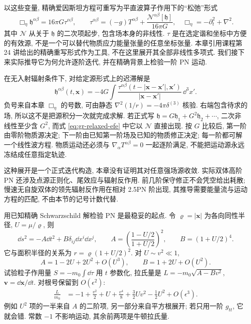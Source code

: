 以这些变量, 精确爱因斯坦方程可重写为平直波算子作用下的“松弛”形式
\begin{equation}
 \Box_\eta\mathfrak h^{\alpha\beta}=16\pi G\tau^{\alpha\beta},\qquad
 \tau^{\alpha\beta}=(-g)T^{\alpha\beta}
                    +\frac{\mathcal N^{\alpha\beta}[\mathfrak h]}{16\pi G},
 \quad \Box_\eta=-\partial_t^2+\nabla^2.
 \label{eq:gr-relaxed-efe}
\end{equation}
其中 $\mathcal N$ 从关于 $\mathfrak h$ 的二次项起步, 包含场本身的非线性. $\tau$ 是在选定谐和坐标中方便的有效源, 不是一个可以替代物质应力能量张量的任意坐标张量. 本章引用课程第 24 讲给出的精确重写形式作为工具, 不在这里展开其全部非线性多项式. 我们接下来实际推导它为何允许逐阶迭代, 并在精确背景上检验一阶 PN 运动.

在无入射辐射条件下, 对给定源形式上的迟滞解是
\begin{equation}
 \mathfrak h^{\alpha\beta}(t,\boldsymbol{x})
   =-4G\int\frac{\tau^{\alpha\beta}(t-|\boldsymbol{x}-\boldsymbol{x}'|,
                        \boldsymbol{x}')}{|\boldsymbol{x}-\boldsymbol{x}'|}\,
                \dd^3x'.
 \label{eq:gr-pn-retarded}
\end{equation}
负号来自本章 $\Box_\eta$ 的号数, 可由静态 $\nabla^2(1/r)=-4\pi\delta^{(3)}$ 核验. 右端包含待求的场, 所以这不是把源积分一次就完成求解. 若正式写 $\mathfrak h=G\mathfrak h_1+G^2\mathfrak h_2+\cdots$, 二次非线性至少含 $G^2$, 而式 \eqref{eq:gr-relaxed-efe} 中它以 $\mathcal N$ 直接出现. 按 $G$ 比较后, 第一阶由零阶物质源决定; 下一阶由已知第一阶场及已知的物质修正决定; 每一阶都可解一个线性波方程. 物质运动还必须与 $\nabla_\alpha T^{\alpha\beta}=0$ 一起逐阶满足, 不能把运动源永远冻结成任意指定轨迹.

这种展开是一个正式迭代构造, 本章没有证明其对任意强场源收敛. 实际双体高阶 PN 还涉及点源正则化、尾效应与辐射反作用. 前几阶保守修正不会凭空给出耗散; 慢速无自旋双体的领先辐射反作用在相对 2.5PN 阶出现, 其推导需要能量流与运动方程的匹配, 不由本节的记号计数代替.


用已知精确 Schwarzschild 解检验 PN 是最稳妥的起点. 令 $\varrho=|\boldsymbol{x}|$ 为各向同性半径, $U=\mu/\varrho$, 则
\begin{equation}
 \dd s^2=-A\dd t^2+B\delta_{ij}\dd x^i\dd x^j,\qquad
 A=\left(\frac{1-U/2}{1+U/2}\right)^2,\qquad
 B=(1+U/2)^4.
 \label{eq:gr-isotropic-exact}
\end{equation}
它与面积半径的关系为 $r=\varrho(1+U/2)^2$. 对 $U\sim v^2\ll1$,
\[
 A=1-2U+2U^2+O(U^3),\qquad B=1+2U+O(U^2).
\]
试验粒子作用量 $S=-m_0\int\dd\tau$ 用 $t$ 参数化, 拉氏量是 $L=-m_0\sqrt{A-Bv^2}$, $\boldsymbol v=\dd\boldsymbol x/\dd t$. 对根号保留到 $O(\epsilon^2)$:
\begin{align}
 \frac L{m_0}
  &=-1+\frac{v^2}2+U+\frac{v^4}8+\frac32Uv^2-\frac12U^2
      +O(\epsilon^3).
 \label{eq:gr-pn-lagrangian}
\end{align}
例如 $U^2$ 项的一半来自 $A$ 的二阶项, 另一部分来自平方根展开; 若只用一阶 $g_{tt}$, 它就会错. 常数 $-1$ 不影响运动, 其余前两项是牛顿拉氏量.

